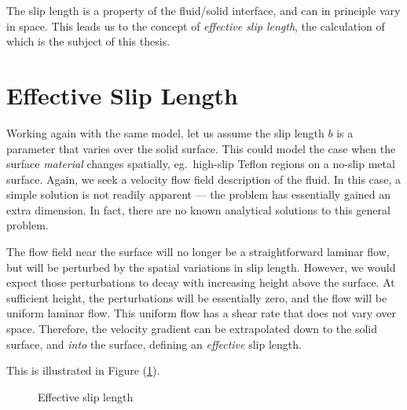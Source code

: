 \documentclass[12pt, a4paper, twoside, openright]{book}
\begin{document}
The slip length is a property of the fluid/solid interface, and can in principle vary in space. This leads us to the concept of \emph{effective slip length}, the calculation of which is the subject of this thesis.

\section{Effective Slip Length}

Working again with the same model, let us assume the slip length $b$ is a parameter that varies over the solid surface. 
This could model the case when the surface \emph{material} changes spatially, eg.\ high-slip Teflon regions on a no-slip metal surface.
Again, we seek a velocity flow field description of the fluid. In this case, a simple solution is not readily apparent --- the problem has essentially gained an extra dimension. In fact, there are no known analytical solutions to this general problem.

The flow field near the surface will no longer be a straightforward laminar flow, but will be perturbed by the spatial variations in slip length. However, we would expect those perturbations to decay with increasing height above the surface. At sufficient height, the perturbations will be essentially zero, and the flow will be uniform laminar flow. This uniform flow has a shear rate that does not vary over space.  Therefore, the velocity gradient can be extrapolated down to the solid surface, and \emph{into} the surface, defining an \emph{effective} slip length.

This is illustrated in Figure (\ref{effslip}).

\begin{figure}[ht!]
\centering
{}
\caption{Effective slip length} \label{effslip} 
\end{figure}
\end{document}
